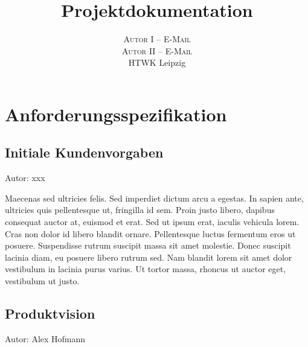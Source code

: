 \documentclass[twoside]{report}
\title{\vspace{-5mm}%
	\fontsize{24pt}{10pt}\selectfont
	\textbf{Projektdokumentation}
	}
\author{%
	\large
	\textsc{Autor I -- E-Mail} \\[2mm]
	\textsc{Autor II -- E-Mail} \\[2mm]
	\normalsize	HTWK Leipzig 
	}
\date{}
\begin{document}

\maketitle
\thispagestyle{fancy}

\tableofcontents


\section{Anforderungsspezifikation}

\subsection{Initiale Kundenvorgaben}
{\small Autor: xxx}

Maecenas sed ultricies felis. Sed imperdiet dictum arcu a egestas.
In sapien ante, ultricies quis pellentesque ut, fringilla id sem. Proin justo libero, dapibus consequat auctor at, euismod et erat. Sed ut ipsum erat, iaculis vehicula lorem. Cras non dolor id libero blandit ornare. Pellentesque luctus fermentum eros ut posuere. Suspendisse rutrum suscipit massa sit amet molestie. Donec suscipit lacinia diam, eu posuere libero rutrum sed. Nam blandit lorem sit amet dolor vestibulum in lacinia purus varius. Ut tortor massa, rhoncus ut auctor eget, vestibulum ut justo.


\subsection{Produktvision}
{\small Autor: Alex Hofmann}
\\
\end{document}
